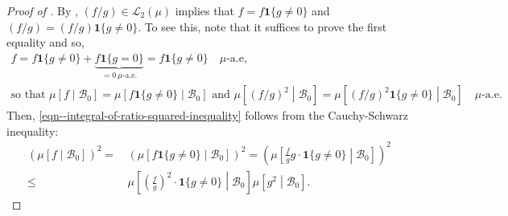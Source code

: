 \begin{proof}[Proof of ]
By , \((f / g) \in \mathscr{L}_{2}
(\mu)\) implies that \(f = f \mathbf{1} \{g \neq 0\}\) and
\((f / g) = (f / g) \mathbf{1} \{g \neq 0\}\).
To see this, note that it suffices to prove the first equality and so,
\begin{equation*}
  \begin{gathered}
    f = f \mathbf{1} \{g \neq 0\} + \underset{= 0 \
    \mu\text{-a.e.}}{\underbrace{f \mathbf{1} \{g = 0\}}} = f \mathbf{1} \{g
    \neq 0\} \quad \mu\text{-a.e}, \\
    \text{so that }
    \mu \left[ f \middle| \mathcal{B}_{0} \right] = \mu \left[ f
    \mathbf{1} \{g \neq 0\} \middle| \mathcal{B}_{0} \right] \text{ and }
    \mu \left[ (f / g)^{2} \middle| \mathcal{B}_{0} \right] = \mu \left[ (f
    / g)^{2} \mathbf{1} \{g \neq 0\} \middle| \mathcal{B}_{0} \right] \quad
    \mu\text{-a.e.}
  \end{gathered}
\end{equation*}
Then, \eqref{eqn--integral-of-ratio-squared-inequality} follows from the
Cauchy-Schwarz inequality:
\begin{equation*}
  \begin{split}
    (\mu \left[ f \middle| \mathcal{B}_{0} \right])^{2}
    =
    & \, (\mu \left[ f \mathbf{1} \{g \neq 0\} \middle| \mathcal{B}_{0}
    \right])^{2}
    = \left( \mu \left[ \frac{f}{g} g \cdot \mathbf{1} \{g \neq 0\} \middle|
    \mathcal{B}_{0} \right] \right)^{2} \\
    \leq & \, \mu \left[ \left( \frac{f}{g} \right)^{2} \cdot \mathbf{1} \{g
    \neq 0\} \middle| \mathcal{B}_{0} \right] \mu \left[ g^{2} \middle|
    \mathcal{B}_{0} \right].
  \end{split}
\end{equation*}
\end{proof}

